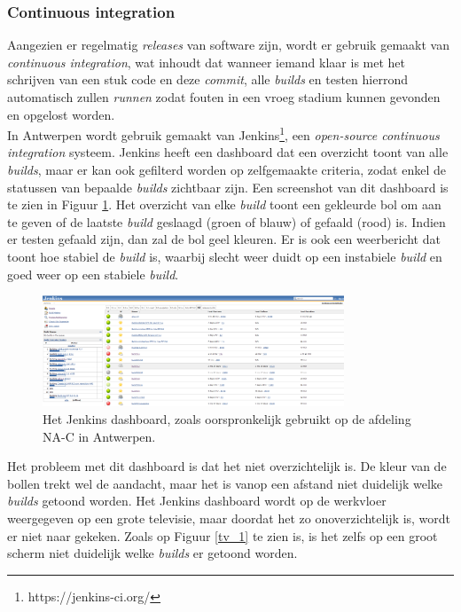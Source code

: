 \documentclass[10pt,a4paper]{article}
\begin{document}
\subsubsection{Continuous integration}
\label{ci}
Aangezien er regelmatig \textit{releases} van software zijn, wordt er gebruik gemaakt van \textit{continuous integration}, wat inhoudt dat wanneer iemand klaar is met het schrijven van een stuk code en deze \textit{commit}, alle \textit{builds} en testen hierrond automatisch zullen \textit{runnen} zodat fouten in een vroeg stadium kunnen gevonden en opgelost worden.\\
In Antwerpen wordt gebruik gemaakt van Jenkins\footnote{https://jenkins-ci.org/}, een \textit{open-source continuous integration} systeem. Jenkins heeft een dashboard dat een overzicht toont van alle \textit{builds}, maar er kan ook gefilterd worden op zelfgemaakte criteria, zodat enkel de statussen van bepaalde \textit{builds} zichtbaar zijn. Een screenshot  van dit dashboard is te zien in Figuur \ref{jenkins_orig}. Het overzicht van elke \textit{build} toont een gekleurde bol om aan te geven of de laatste \textit{build} geslaagd (groen of blauw) of gefaald (rood) is. Indien er testen gefaald zijn, dan zal de bol geel kleuren.
Er is ook een weerbericht dat toont hoe stabiel de \textit{build} is, waarbij slecht weer duidt op een instabiele \textit{build} en goed weer op een stabiele \textit{build}. 

\begin{figure}[ht!]
\centering
\includegraphics[width=90mm]{CaptureJenkins.png}
\caption{Het Jenkins dashboard, zoals oorspronkelijk gebruikt op de afdeling NA-C in Antwerpen.} 
\label{jenkins_orig}
\end{figure}

Het probleem met dit dashboard is dat het niet overzichtelijk is. De kleur van de bollen trekt wel de aandacht, maar het is vanop een afstand niet duidelijk welke \textit{builds} getoond worden. Het Jenkins dashboard wordt op de werkvloer weergegeven op een grote televisie, maar doordat het zo onoverzichtelijk is, wordt er niet naar gekeken. Zoals op Figuur \ref{tv_1} te zien is, is het zelfs op een groot scherm niet duidelijk welke \textit{builds} er getoond worden.
\end{document}
